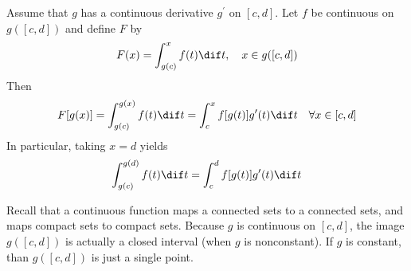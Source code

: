 \documentclass[thmcnt=section, color=blue, 12pt]{my-elegantbook}
\begin{document}
\begin{theorem} \label{thm:26}
	Assume that $g$ has a continuous derivative $g^\prime$ on $[c, d]$.
	Let $f$ be continuous on $g([c, d])$
	and define $F$ by
	\begin{align*}
		F(x) = \int_{g(c)}^x f(t) \dif t,
		\quad x \in g([c, d])
	\end{align*}
	Then
	\begin{align}
		F[g(x)]
		=\int_{g(c)}^{g(x)} f(t) \dif t
		= \int_c^x f[g(t)] g^\prime(t) \dif t
		\quad \forall x \in [c, d]
		\label{eq:60}
	\end{align}
	In particular, taking $x = d$ yields
	\begin{align*}
		\int_{g(c)}^{g(d)} f(t) \dif t
		= \int_c^d f[g(t)] g^\prime(t) \dif t
	\end{align*}
\end{theorem}


\begin{note}
	Recall that a continuous function maps a connected sets to a connected sets,
	and maps compact sets to compact sets.
	Because $g$ is continuous on $[c, d]$, the image $g([c, d])$
	is actually a closed interval (when $g$ is nonconstant).
	If $g$ is constant, than $g([c, d])$ is just a single point.
\end{note}
\end{document}

